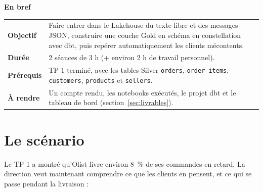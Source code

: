 \documentclass[11pt,a4paper]{article}
\newcommand{\cmd}[1]{\texttt{#1}}
\begin{document}

\thispagestyle{empty}
\vspace*{4.2cm}

{\large\bfseries\color{lhblue}En bref}\par\smallskip
\begin{tabularx}{\linewidth}{@{}>{\bfseries}l X@{}}
\toprule
Objectif & Faire entrer dans le Lakehouse du texte libre et des messages JSON, construire une couche
           Gold en schéma en constellation avec dbt, puis repérer automatiquement les clients mécontents. \\
Durée    & 2 séances de 3 h (+ environ 2 h de travail personnel). \\
Prérequis & TP 1 terminé, avec les tables Silver \cmd{orders}, \cmd{order\_items}, \cmd{customers},
            \cmd{products} et \cmd{sellers}. \\
À rendre & Un compte rendu, les notebooks exécutés, le projet dbt et le tableau de bord
           (section~\ref{sec:livrables}). \\
\bottomrule
\end{tabularx}

\section{Le scénario}

Le TP 1 a montré qu'Olist livre environ 8~\% de ses commandes en retard. La direction veut
maintenant comprendre ce que les clients en pensent, et ce qui se passe pendant la livraison :
\end{document}
